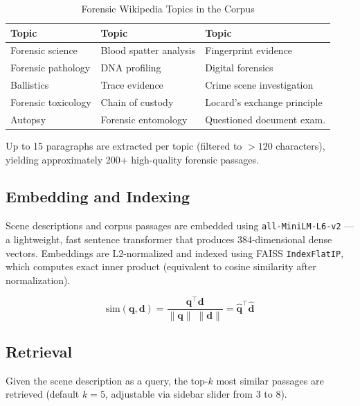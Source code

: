 \documentclass[12pt,a4paper]{article}
\begin{document}
\begin{table}[h!]
  \centering
  \caption{Forensic Wikipedia Topics in the Corpus}
  \begin{tabular}{lll}
    \toprule
    \textbf{Topic} & \textbf{Topic} & \textbf{Topic} \\
    \midrule
    Forensic science         & Blood spatter analysis   & Fingerprint evidence \\
    Forensic pathology       & DNA profiling            & Digital forensics \\
    Ballistics               & Trace evidence           & Crime scene investigation \\
    Forensic toxicology      & Chain of custody         & Locard's exchange principle \\
    Autopsy                  & Forensic entomology      & Questioned document exam. \\
    \bottomrule
  \end{tabular}
\end{table}

Up to 15 paragraphs are extracted per topic (filtered to $> 120$ characters),
yielding approximately 200+ high-quality forensic passages.

\subsection{Embedding and Indexing}

Scene descriptions and corpus passages are embedded using
\texttt{all-MiniLM-L6-v2} — a lightweight, fast sentence transformer that
produces 384-dimensional dense vectors. Embeddings are L2-normalized and
indexed using FAISS \texttt{IndexFlatIP}, which computes exact inner product
(equivalent to cosine similarity after normalization).

\begin{equation}
  \text{sim}(\mathbf{q}, \mathbf{d}) = \frac{\mathbf{q}^\top \mathbf{d}}
  {\|\mathbf{q}\|\;\|\mathbf{d}\|} = \mathbf{\hat{q}}^\top \mathbf{\hat{d}}
\end{equation}

\subsection{Retrieval}

Given the scene description as a query, the top-$k$ most similar passages are
retrieved (default $k = 5$, adjustable via sidebar slider from 3 to 8).
\end{document}
